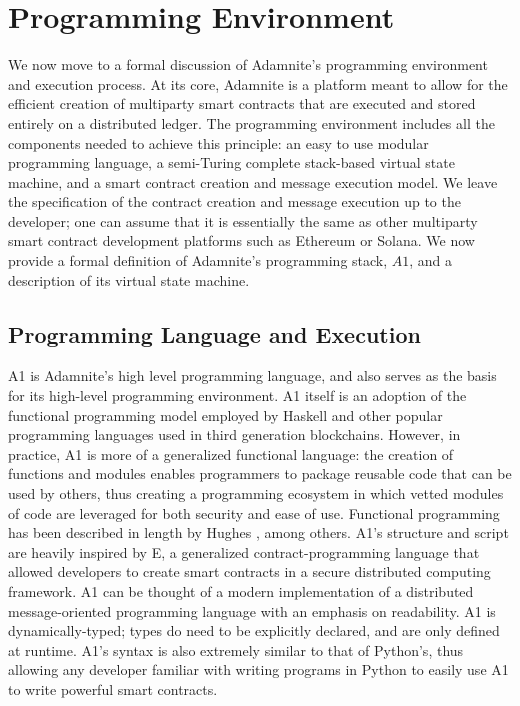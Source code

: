 \documentclass[conference]{IEEEtran}
\begin{document}
\section{Programming Environment}

We now move to a formal discussion of Adamnite's programming environment and execution process. At its core, Adamnite is a platform meant to allow for the efficient creation of multiparty smart contracts that are executed and stored entirely on a distributed ledger. The programming environment includes all the components needed to achieve this principle: an easy to use modular programming language, a semi-Turing complete stack-based virtual state machine, and a smart contract creation and message execution model. We leave the specification of the contract creation and message execution up to the developer; one can assume that it is essentially the same as other multiparty smart contract development platforms such as Ethereum or Solana. We now provide a formal definition of Adamnite's programming stack, $A1$, and a description of its virtual state machine. 

\subsection{Programming Language and Execution}
A1 is Adamnite's high level programming language, and also serves as the basis for its high-level programming environment. A1 itself is an adoption of the functional programming model employed by Haskell and other popular programming languages used in third generation blockchains. However, in practice, A1 is more of a generalized functional language: the creation of functions and modules enables programmers to package reusable code that can be used by others, thus creating a programming ecosystem in which vetted modules of code are leveraged for both security and ease of use. Functional programming has been described in length by Hughes \cite{hughesFunctional}, among others. A1's structure and script are heavily inspired by E, a generalized contract-programming language that allowed developers to create smart contracts in a secure distributed computing framework. A1 can be thought of a modern implementation of a distributed message-oriented programming language with an emphasis on readability. A1 is dynamically-typed; types do need to be explicitly declared, and are only defined at runtime. A1's syntax is also extremely similar to that of Python's, thus allowing any developer familiar with writing programs in Python to easily use A1 to write powerful smart contracts.  \\
\end{document}
